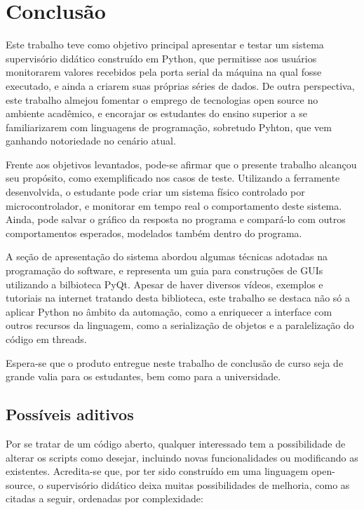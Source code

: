 \chapter{Conclusão}

Este trabalho teve como objetivo principal apresentar e testar um sistema supervisório didático construído em Python, que permitisse aos usuários monitorarem valores recebidos pela porta serial da máquina na qual fosse executado, e ainda a criarem suas próprias séries de dados. De outra perspectiva, este trabalho almejou fomentar o emprego de tecnologias open source no ambiente acadêmico, e encorajar os estudantes do ensino superior a se familiarizarem com linguagens de programação, sobretudo Pyhton, que vem ganhando notoriedade no cenário atual.

Frente aos objetivos levantados, pode-se afirmar que o presente trabalho alcançou seu propósito, como exemplificado nos casos de teste. Utilizando a ferramente desenvolvida, o estudante pode criar um sistema físico controlado por microcontrolador, e monitorar em tempo real o comportamento deste sistema. Ainda, pode salvar o gráfico da resposta no programa e compará-lo com outros comportamentos esperados, modelados também dentro do programa.

A seção de apresentação do sistema abordou algumas técnicas adotadas na programação do software, e representa um guia para construções de GUIs utilizando a bilbioteca PyQt. Apesar de haver diversos vídeos, exemplos e tutoriais na internet tratando desta biblioteca, este trabalho se destaca não só a aplicar Python no âmbito da automação, como a enriquecer a interface com outros recursos da linguagem, como a serialização de objetos e a paralelização do código em threads.

Espera-se que o produto entregue neste trabalho de conclusão de curso seja de grande valia para os estudantes, bem como para a universidade.

\section{Possíveis aditivos}

Por se tratar de um código aberto, qualquer interessado tem a possibilidade de alterar os scripts como desejar, incluindo novas funcionalidades ou modificando as existentes. Acredita-se que, por ter sido construído em uma linguagem open-source, o supervisório didático deixa muitas possibilidades de melhoria, como as citadas a seguir, ordenadas por complexidade:

